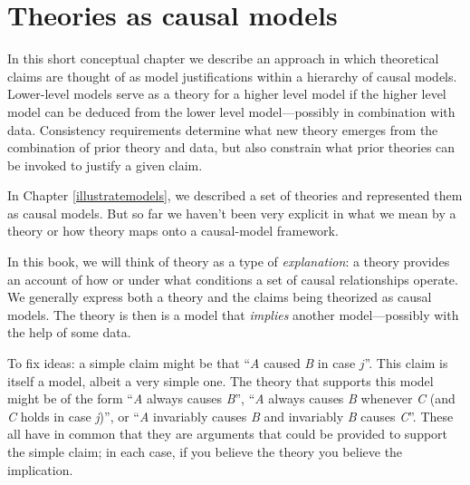 \documentclass[
  12pt,
]{book}
\newenvironment{headerbox}{
  \definecolor{shadecolor}{rgb}{0.8, 0.8, 0.8}  %
  \color{black}
  \begin{shaded}}{\end{shaded}}
\begin{document}
\hypertarget{theory}{%
\chapter{Theories as causal models}\label{theory}}

\begin{headerbox}
In this short conceptual chapter we describe an approach in which theoretical claims are thought of as model justifications within a hierarchy of causal models. Lower-level models serve as a theory for a higher level model if the higher level model can be deduced from the lower level model---possibly in combination with data. Consistency requirements determine what new theory emerges from the combination of prior theory and data, but also constrain what prior theories can be invoked to justify a given claim.

\end{headerbox}

In Chapter \ref{illustratemodels}, we described a set of theories and represented them as causal models. But so far we haven't been very explicit in what we mean by a theory or how theory maps onto a causal-model framework.

In this book, we will think of theory as a type of \emph{explanation}: a theory provides an account of how or under what conditions a set of causal relationships operate. We generally express both a theory and the claims being theorized as causal models. The theory is then is a model that \emph{implies} another model---possibly with the help of some data.

To fix ideas: a simple claim might be that ``\emph{A} caused \emph{B} in case \(j\)''. This claim is itself a model, albeit a very simple one. The theory that supports this model might be of the form ``\emph{A} always causes \emph{B}'', ``\emph{A} always causes \emph{B} whenever \emph{C} (and \emph{C} holds in case \emph{j})'', or ``\emph{A} invariably causes \emph{B} and invariably \emph{B} causes \emph{C}''. These all have in common that they are arguments that could be provided to support the simple claim; in each case, if you believe the theory you believe the implication.
\end{document}
